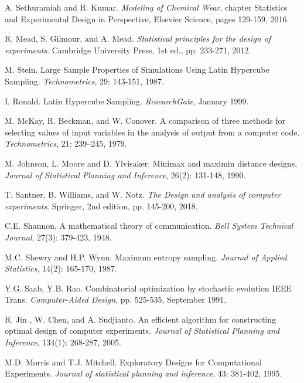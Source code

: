 \documentclass[twoside, 12pt,notitlepage]{report}
\begin{document}
\begin{thebibliography}{9}
A. Sethuramiah and R. Kumar. \textit{Modeling of Chemical 
Wear}, chapter Statistics and Experimental Design in 
Perspective, Elsevier Science, pages 129-159, 2016.

R. Mead, S. Gilmour, and  A. Mead. \textit{Statistical 
principles for the design of experiments}. Cambridge 
University Press, 1st ed., pp. 233-271, 2012.

M. Stein. Large Sample Properties of Simulations Using Latin 
Hypercube Sampling. \textit{Technometrics}, 29: 143-151, 
1987. 

I. Ronald. Latin Hypercube Sampling. \textit{ResearchGate}, 
January 1999.

M. McKay, R. Beckman, and W. Conover. A comparison of three methods 
for selecting values of input variables in the analysis of output 
from a computer code. \textit{Technometrics}, 21: 239–245, 1979.

M. Johnson, L. Moore and D. Ylvisaker. Minimax and maximin 
distance designs, \textit{Journal of Statistical Planning and 
Inference}, 26(2): 131-148, 1990.

T. Santner, B. Williams, and W. Notz. \textit{The Design and 
analysis of computer experiments}. Springer, 2nd edition, 
pp. 145-200, 2018.
 
C.E. Shannon, A mathematical theory of communication. 
\textit{Bell System Technical Journal}, 27(3): 379-423, 1948.

M.C. Shewry and H.P. Wynn. Maximum entropy sampling. 
\textit{Journal of Applied Statistics}, 14(2): 165-170, 1987.


Y.G. Saab, Y.B. Rao. Combinatorial optimization by 
stochastic evolution IEEE Trans. \textit{Computer-Aided 
Design}, pp. 525-535, September 1991,

R. Jin , W. Chen, and A. Sudjianto. An efficient 
algorithm for constructing optimal design of computer 
experiments. \textit{Journal of Statistical Planning and 
Inference}, 134(1): 268-287, 2005.

M.D. Morris and  T.J. Mitchell. Exploratory Designs for 
Computational Experiments. \textit{Journal of statistical 
planning and inference}, 43: 381-402, 1995. 


\end{thebibliography}
\end{document}
